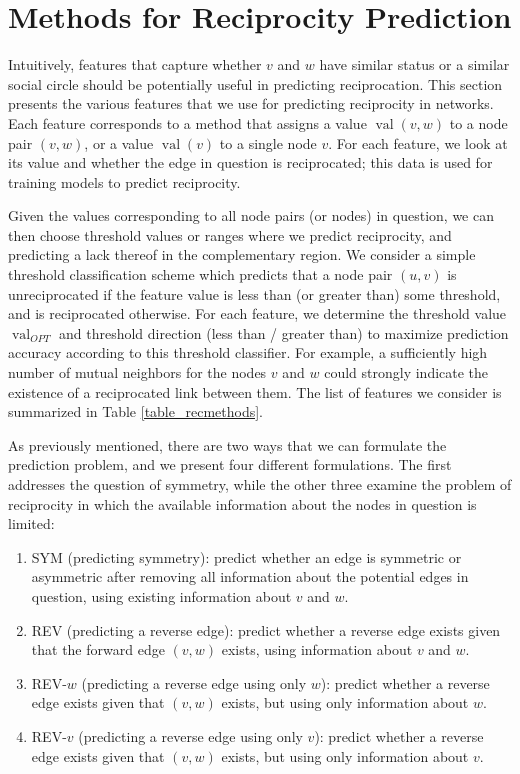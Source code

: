 \documentclass[conference]{IEEEtran}
\begin{document}
\section{Methods for Reciprocity Prediction}
Intuitively, features that capture whether $v$ and $w$ have similar status or a similar social circle should be potentially useful in predicting reciprocation. 
This section presents the various features that we use for predicting reciprocity in networks. 
Each feature corresponds to a method that assigns a value $\operatorname{val}(v,w)$ to a node pair $(v,w)$, or a value $\operatorname{val}(v)$ to a single node $v$. 
For each feature, we look at its value and whether the edge in question is reciprocated; this data is used for training models to predict reciprocity.

Given the values corresponding to all node pairs (or nodes) in question, we can then choose threshold values or ranges where we predict reciprocity, 
and predicting a lack thereof in the complementary region.
We consider a simple threshold classification scheme which predicts that a node pair $(u,v)$ is unreciprocated if the feature value is less than (or greater than) some threshold, and is reciprocated otherwise.
For each feature, we determine the threshold value $\operatorname{val}_{OPT}$ and threshold direction (less than / greater than) to maximize prediction accuracy according to this threshold classifier.
For example, a sufficiently high number of mutual neighbors 
for the nodes $v$ and $w$ could strongly indicate the existence of a reciprocated link between them.
The list of features we consider is summarized in Table \ref{table_recmethods}.

As previously mentioned, there are two ways that we can formulate the prediction problem, and we present four different formulations. 
The first addresses the question of symmetry, while the other three examine the problem of reciprocity in which the available information about the nodes in question is limited:

\begin{enumerate}
\item SYM (predicting symmetry): predict whether an edge is symmetric or asymmetric after removing all information about the potential edges in question, using existing information about $v$ and $w$.
\item REV (predicting a reverse edge): predict whether a reverse edge exists given that the forward edge $(v,w)$ exists, using information about $v$ and $w$.
\item REV-$w$ (predicting a reverse edge using only $w$): predict whether a reverse edge exists given that $(v,w)$ exists, but using only information about $w$.
\item REV-$v$ (predicting a reverse edge using only $v$): predict whether a reverse edge exists given that $(v,w)$ exists, but using only information about $v$.
\end{enumerate}
\end{document}
